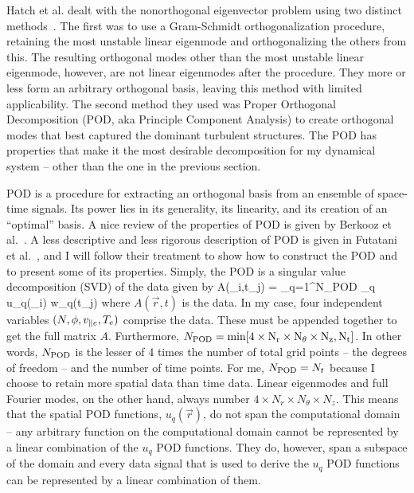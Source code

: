Hatch et al. dealt with the nonorthogonal eigenvector problem using two distinct methods~\cite{hatch2011}. The first was to use a Gram-Schmidt orthogonalization
procedure, retaining the most unstable linear eigenmode and orthogonalizing the others from this. The resulting orthogonal modes other than the most unstable linear eigenmode, however, are not
linear eigenmodes after the procedure. They more or less form an arbitrary orthogonal basis, leaving this method with limited applicability. 
The second method they used was Proper Orthogonal Decomposition (POD, aka Principle Component Analysis) to create orthogonal modes that best
captured the dominant turbulent structures. The POD has properties that make it the most desirable decomposition for my dynamical system -- other than the one in the previous section.

POD is a procedure for extracting an orthogonal basis from an ensemble of space-time signals. Its power lies in its generality, its linearity, and its creation of an ``optimal'' basis.
A nice review of the properties of POD is given by Berkooz et al.~\cite{berkooz1993}. A less descriptive and less rigorous description of POD is given in Futatani et al.~\cite{futatani2009},
and I will follow their treatment to show how to construct the POD and to present some of its properties. Simply, the POD is a singular value decomposition (SVD) of the data given by
\beq
\label{svd}
A(_i,t_j) = \sum_{q=1}^{N_{\rm{POD}}} \sigma_q u_q(_i) w_q(t_j)
\eeq
where $A(\vec{r},t)$ is the data.  In my case, four independent variables
$(N, \phi, v_{\parallel e}, T_e)$ comprise the data. These must be appended together to get the full matrix $A$. Furthermore, $N_{\rm{POD}} = \rm{min}[4 \times N_r \times N_\theta \times N_z,N_t]$. 
In other words, $N_{\rm{POD}}$ is the lesser
of 4 times the number of total grid points -- the degrees of freedom -- and the number of time points. For me, $N_{\rm{POD}} = N_t$ because I choose to retain more spatial data than time data.
Linear eigenmodes and full Fourier modes, on the other hand, always number $4 \times N_r \times N_\theta \times N_z$. This means that the spatial POD functions, $u_q(\vec{r})$,
do not span the computational domain -- any arbitrary function on the computational domain cannot be represented by a linear combination of the $u_q$ POD functions. 
They do, however, span a subspace of the domain and every data signal that is used to derive the $u_q$ POD functions can be represented by a linear combination of them.

